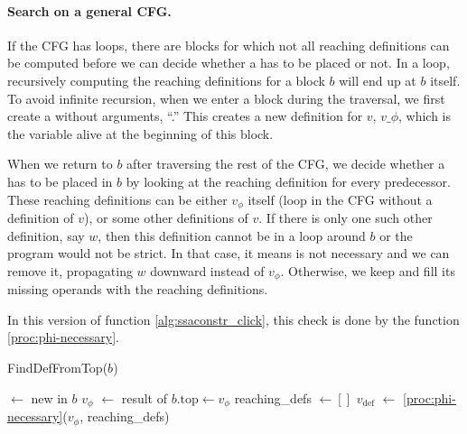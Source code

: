 {\paragraph{Search on a general CFG.}
If the CFG has loops, there are blocks for which not all reaching definitions can be computed before we can decide whether a \phifun has to be placed or not.
In a loop, recursively computing the reaching definitions for a block $b$ will end up at $b$ itself.
To avoid infinite recursion, when we enter a block during the traversal, we first create a \phifun without arguments, ``\pendphi.''
This creates a new definition for $v$, $v\_\phi$, which is the variable alive at the beginning of this block.


When we return to $b$ after traversing the rest of the CFG, we decide whether a \phifun has to be placed in $b$ by looking at the reaching definition for every predecessor.
These reaching definitions can be either $v_\phi$ itself (loop in the CFG without a definition of $v$), or some other definitions of $v$.
If there is only one such other definition, say $w$, then this definition cannot be in a loop around $b$ or the program would not be strict.
In that case, it means \pendphi is not necessary and we can remove it, propagating $w$ downward instead of $v_\phi$. Otherwise, we keep \pendphi and fill its missing operands with the reaching definitions.

In this version of function \ref{alg:ssaconstr_click}, this check is done by the function \ref{proc:phi-necessary}.

\begin{procedure}
  \caption{FindDefFromTop($b$)}
  \label{proc:find-def-from-begin}
  \label{alg:ssaconstr_click}
  \pendphi $\gets$ new \phifun in $b$\;
  $v_\phi$ $\gets$ result of \pendphi\;
  $b.\mbox{top} \gets v_\phi$\;
  reaching\_defs $\gets []$\;
  $v_\textrm{def}$ $\gets$ \ref{proc:phi-necessary}($v_\phi$, reaching\_defs)\;
\end{procedure}

}
